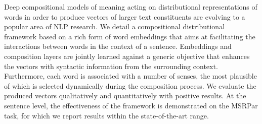 Deep compositional models of meaning acting on distributional representations of words in order to produce vectors of larger text constituents are evolving to a popular area of NLP research. We detail a compositional distributional framework based on a rich form of word embeddings that aims at facilitating the interactions between words in the context of a sentence. Embeddings and composition layers are jointly learned against a generic objective that enhances the vectors with syntactic information from the surrounding context. Furthermore, each word is associated with a number of senses, the most plausible of which is selected dynamically during the composition process. We evaluate the produced vectors qualitatively and quantitatively with positive results. At the sentence level, the effectiveness of the framework is demonstrated on the MSRPar task, for which we report results within the state-of-the-art range.
